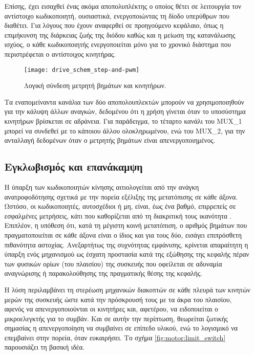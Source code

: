 Επίσης, έχει εισαχθεί ένας ακόμα αποπολυπλέκτης ο οποίος θέτει σε λειτουργία
τον αντίστοιχο κωδικοποιητή, ουσιαστικά, ενεργοποιώντας τη δίοδο υπερύθρων που
διαθέτει. Για λόγους που έχουν αναφερθεί σε προηγούμενο κεφάλαιο, όπως η
επιμήκυνση της διάρκειας ζωής της διόδου καθώς και η μείωση της κατανάλωσης
ισχύος, ο κάθε κωδικοποιητής ενεργοποιείται μόνο για το χρονικό διάστημα που
περιστρέφεται ο αντίστοιχος κινητήρας.

\begin{figure}
    \caption{Λογική σύνδεση μετρητή βημάτων και κινητήρων.
    \label{fig:motor:route_steps}}
    \begin{center}
    \texttt{[image: drive\_schem\_step-and-pwm]}
    \end{center}
\end{figure}

Τα εναπομείναντα κανάλια των δύο αποπολουπλεκτών μπορούν να χρησιμοποιηθούν για
την κάλυψη άλλων αναγκών, δεδομένου ότι η χρήση γίνεται όταν το υποσύστημα
κινητήρων βρίσκεται σε αδράνεια. Για παράδειγμα, το τέταρτο κανάλι του MUX\_1
μπορεί να συνδεθεί με το  κάποιου άλλου ολοκληρωμένου, ενώ του MUX\_2,
για την ανταλλαγή δεδομένων όταν ο μετρητής βημάτων είναι απενεργοποιημένος.


\subsection{Εγκλωβισμός και επανάκαμψη}

Η ύπαρξη των κωδικοποιητών κίνησης αιτιολογείται από την ανάγκη ανατροφοδότησης
σχετικά με την πορεία εξέλιξης της μετατόπισης σε κάθε άξονα. Ωστόσο, οι
κωδικοποιητές, αυτοσχέδιοι ή μη, είναι, έως ένα βαθμό, επιρρεπείς σε εσφαλμένες
μετρήσεις, κάτι που καθορίζεται από τη διακριτική τους ικανότητα
\parencite[15--16]{albert11}. Επιπλέον, η υπόθεση ότι, κατά τη μέγιστη κοινή
μετατόπιση, ο αριθμός βημάτων που πραγματοποιείται σε κάθε άξονα είναι ο ίδιος
και για τους δύο, εισάγει επιπρόσθετη πιθανότητα αστοχίας. Ανεξαρτήτως της
συχνότητας εμφάνισης, κρίνεται απαραίτητη η ύπαρξη ενός μηχανισμού ως έσχατη
προστασία κατά της εξώθησης της κεφαλής πέραν των φυσικών ορίων (του πλαισίου)
της συσκευής που οφείλεται σε αδυναμία αναγνώρισης ή παρακολούθησης της
πραγματικής θέσης της κεφαλής.

Η λύση περιλαμβάνει τη στερέωση μηχανικών διακοπτών σε κάθε πλευρά των κινητών
μερών της συσκευής ώστε κατά την πρόσκρουσή τους με τα άκρα του πλαισίου, αφενός
να απενεργοποιούνται οι κινητήρες και, αφετέρου, να ειδοποιείται ο μικροελεγκτής
για το συμβάν. Και σε αυτήν την περίπτωση, θεωρείται ζωτικής σημασίας η
απενεργοποίηση να συμβαίνει σε επίπεδο υλικού, ενώ το λογισμικό να επεμβαίνει
στην πορεία, όταν ευκαιρήσει. Το σχήμα \ref{fig:motor:limit_switch} παρουσιάζει
τη βασική ιδέα.

